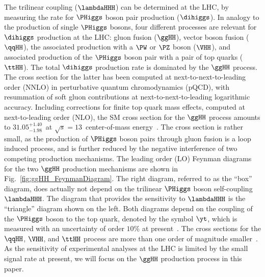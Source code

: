 The trilinear coupling ($\lambdaHHH$) can be determined at the LHC, by measuring the rate for $\PHiggs$ boson pair production ($\dihiggs$). 
In analogy to the production of single $\PHiggs$ bosons, 
four different processes are relevant for $\dihiggs$ production at the LHC: 
gluon fusion ($\ggHH$), vector boson fusion ($\qqHH$), the associated production with a $\PW$ or $\PZ$ boson ($\VHH$),
and associated production of the $\PHiggs$ boson pair with a pair of top quarks ($\ttHH$).
The total $\dihiggs$ production rate is dominated by the $\ggHH$ process.
The cross section for the latter has been computed at next-to-next-to-leading order (NNLO) in perturbative quantum chromodynamics (pQCD),
with resummation of soft gluon contributions at next-to-next-to-leading logarithmic accuracy.
Including corrections for finite top quark mass effects, computed at next-to-leading order (NLO),
the SM cross section for the $\ggHH$ process amounts to $31.05^{+1.40}_{-1.98}$~\fb at $\sqrt{s} = 13$~\TeV center-of-mass energy~\cite{Grazzini:2018hh}.
The cross section is rather small, as the production of $\PHiggs$ boson pairs through gluon fusion is a loop induced process,
and is further reduced by the negative interference of two competing production mechanisms.
The leading order (LO) Feynman diagrams for the two $\ggHH$ production mechanisms are shown in Fig.~\ref{fig:ggHH_FeynmanDiagram}.
The right diagram, referred to as the ``box'' diagram, does actually not depend on the trilinear $\PHiggs$ boson self-coupling $\lambdaHHH$.
The diagram that provides the sensitivity to $\lambdaHHH$ is the ``triangle'' diagram shown on the left.
Both diagrams depend on the coupling of the $\PHiggs$ boson to the top quark, denoted by the symbol $\yt$,
which is measured with an uncertainty of order $10\%$ at present~\cite{Aaboud:2018urx,HIG-17-035}.
The cross sections for the $\qqHH$, $\VHH$, and $\ttHH$ process are more than one order of magnitude smaller~\cite{Baglio:2012np}.
As the sensitivity of experimental analyses at the LHC is limited by the small signal rate at present,
we will focus on the $\ggHH$ production process in this paper.

